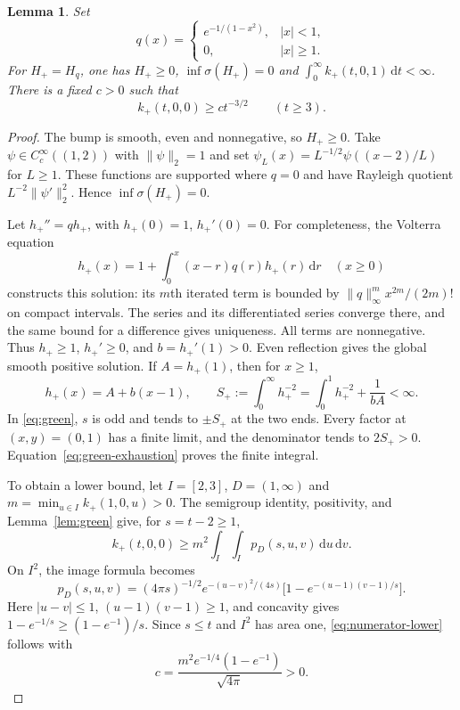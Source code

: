 \documentclass[11pt,a4paper]{article}
\newtheorem{lemma}[theorem]{Lemma}
\newcommand{\dd}{\,\mathrm d}
\newcommand{\spec}{\sigma}
\begin{document}
\begin{lemma}\label{lem:numerator}
Set
\[
 q(x)=\begin{cases}e^{-1/(1-x^2)},&|x|<1,\\0,&|x|\geq1.\end{cases}
\]
For $H_+=H_q$, one has $H_+\geq0$, $\inf\spec(H_+)=0$ and
$\int_0^\infty k_+(t,0,1)\dd t<\infty$. There is a fixed $c>0$ such that
\begin{equation}\label{eq:numerator-lower}
 k_+(t,0,0)\geq ct^{-3/2}\qquad(t\geq3).
\end{equation}
\end{lemma}
\begin{proof}
The bump is smooth, even and nonnegative, so $H_+\geq0$. Take
$\psi\in C_c^\infty((1,2))$ with $\|\psi\|_2=1$ and set
$\psi_L(x)=L^{-1/2}\psi((x-2)/L)$ for $L\geq1$. These functions are
supported where $q=0$ and have Rayleigh quotient
$L^{-2}\|\psi'\|_2^2$. Hence $\inf\spec(H_+)=0$.

Let $h_+''=qh_+$, with $h_+(0)=1$, $h_+'(0)=0$. For completeness, the
Volterra equation
\[
 h_+(x)=1+\int_0^x(x-r)q(r)h_+(r)\dd r\quad(x\geq0)
\]
constructs this solution: its $m$th iterated term is bounded by
$\|q\|_\infty^m x^{2m}/(2m)!$ on compact intervals. The series and its
differentiated series converge there, and the same bound for a difference
gives uniqueness. All terms are nonnegative. Thus $h_+\geq1$,
$h_+'\geq0$, and $b=h_+'(1)>0$. Even reflection gives the global smooth
positive solution. If $A=h_+(1)$, then for $x\geq1$,
\[
 h_+(x)=A+b(x-1),\qquad
 S_+:=\int_0^\infty h_+^{-2}
     =\int_0^1 h_+^{-2}+\frac1{bA}<\infty.
\]
In \eqref{eq:green}, $s$ is odd and tends to $\pm S_+$ at the two ends.
Every factor at $(x,y)=(0,1)$ has a finite limit, and the denominator tends
to $2S_+>0$. Equation~\eqref{eq:green-exhaustion} proves the finite integral.

To obtain a lower bound, let $I=[2,3]$, $D=(1,\infty)$ and
$m=\min_{u\in I}k_+(1,0,u)>0$. The semigroup identity, positivity, and
Lemma~\ref{lem:green} give, for $s=t-2\geq1$,
\[
 k_+(t,0,0)\geq m^2\int_I\int_I p_D(s,u,v)\dd u\dd v.
\]
On $I^2$, the image formula becomes
\[
 p_D(s,u,v)=(4\pi s)^{-1/2}e^{-(u-v)^2/(4s)}
                 \bigl[1-e^{-(u-1)(v-1)/s}\bigr].
\]
Here $|u-v|\leq1$, $(u-1)(v-1)\geq1$, and concavity gives
$1-e^{-1/s}\geq(1-e^{-1})/s$. Since $s\leq t$ and $I^2$ has area one,
\eqref{eq:numerator-lower} follows with
\begin{equation}\label{eq:constant-c}
 c=\frac{m^2e^{-1/4}(1-e^{-1})}{\sqrt{4\pi}}>0.
\end{equation}
\end{proof}
\end{document}
